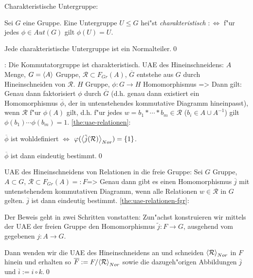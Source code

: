  Charakteristische Untergruppe:{
  Sei $G$ eine Gruppe. Eine Untergruppe $U\leq G$ hei"st \emph{charakteristisch}
  $:\iff$ f"ur jedes $\phi\in Aut(G)$ gilt $\phi(U)=U$. 
  
  Jede charakteristische Untergruppe ist ein Normalteiler.\qed
  }
\remark:{
  Die Kommutatorgruppe ist charakteristisch.
  }
\theorem UAE des Hineinschneidens:
  $A$ Menge, $G={\left\langle A\right\rangle}$ Gruppe, $\mathcal R\subset F_{Gr}(A)$,
  $\overline G$ entstehe aus $G$ durch Hineinschneiden von $\mathcal R$.
  $H$ Gruppe, $\phi:G\to H$ Homomorphismus
  =>{
  \label{the:uae-relationen}
  Dann gilt: Genau dann faktorisiert $\phi$ durch $\overline G$ 
  (d.h. genau dann existiert ein Homomorphismus $\overline \phi$, der in
  untenstehendes kommutative Diagramm hineinpasst), wenn 
  $\mathcal R$ f"ur $\phi(A)$ gilt, d.h. f"ur jedes $w=b_1*\cdots *b_m\in\mathcal R$
  ($b_i\in A\cup A^{-1}$) gilt $\phi(b_1)\cdots \phi(b_m)=1$.
  }
\proof \ref{the:uae-relationen}:{
  $\overline \phi$ ist wohldefiniert $\iff $ 
  $\varphi({\left\langle\tilde j(\mathcal R)\right\rangle}_{Nor})=\{1\}$.
  
  $\overline \phi$ ist dann eindeutig bestimmt.\qed
  }
\theorem UAE des Hineinschneidens von Relationen in die freie Gruppe:
  Sei $G$ Gruppe, $A\subset G$, $\mathcal R\subset F_{Gr}(A)=:F$=>{
  \label{the:uae-relationen-fgr}
  Genau dann gibt es einen Homomorphismus $\overline j$ mit untenstehendem
  kommutativen Diagramm, wenn alle Relationen $w\in\mathcal R$ in $G$ gelten.
  $\overline j$ ist dann eindeutig bestimmt.
  }
\proof \ref{the:uae-relationen-fgr}:{
  Der Beweis geht in zwei Schritten vonstatten: Zun"achst konstruieren
  wir mittels der UAE der freien Gruppe den Homomorphismus $\tilde j:F\to G$,
  ausgehend vom gegebenen $j:A\to G$.
  
  Dann wenden wir die UAE des Hineinschneidens an und schneiden 
  ${\left\langle\mathcal R\right\rangle}_{Nor}$ in $F$ hinein und erhalten so
  $\overline F:=F/{\left\langle\mathcal R\right\rangle}_{Nor}$ sowie die dazugeh"origen
  Abbildungen $\overline j$ und $\overline i:=i\circ k$.\qed
  }
